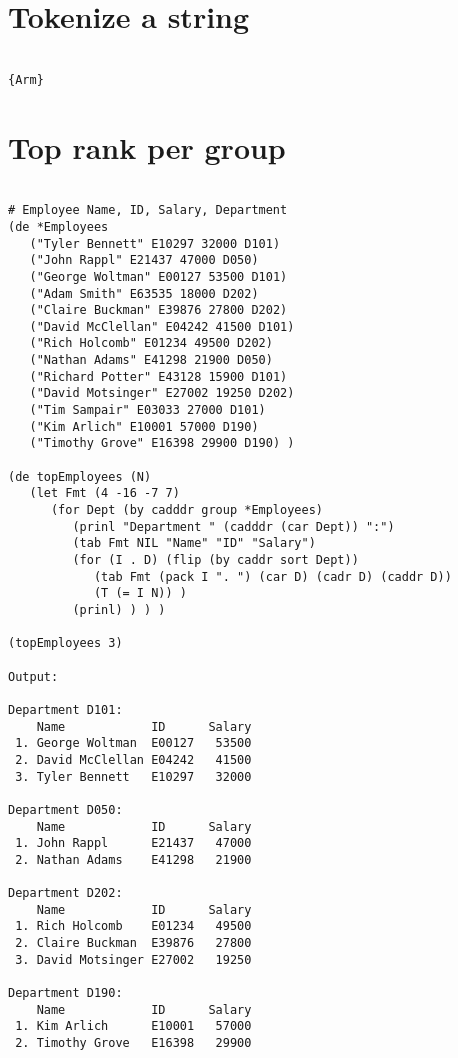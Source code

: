 \section*{Tokenize a string}

\begin{verbatim}

{Arm}

\end{verbatim}

\section*{Top rank per group}

\begin{verbatim}

# Employee Name, ID, Salary, Department
(de *Employees
   ("Tyler Bennett" E10297 32000 D101)
   ("John Rappl" E21437 47000 D050)
   ("George Woltman" E00127 53500 D101)
   ("Adam Smith" E63535 18000 D202)
   ("Claire Buckman" E39876 27800 D202)
   ("David McClellan" E04242 41500 D101)
   ("Rich Holcomb" E01234 49500 D202)
   ("Nathan Adams" E41298 21900 D050)
   ("Richard Potter" E43128 15900 D101)
   ("David Motsinger" E27002 19250 D202)
   ("Tim Sampair" E03033 27000 D101)
   ("Kim Arlich" E10001 57000 D190)
   ("Timothy Grove" E16398 29900 D190) )

(de topEmployees (N)
   (let Fmt (4 -16 -7 7)
      (for Dept (by cadddr group *Employees)
         (prinl "Department " (cadddr (car Dept)) ":")
         (tab Fmt NIL "Name" "ID" "Salary")
         (for (I . D) (flip (by caddr sort Dept))
            (tab Fmt (pack I ". ") (car D) (cadr D) (caddr D))
            (T (= I N)) )
         (prinl) ) ) )

(topEmployees 3)

Output:

Department D101:
    Name            ID      Salary
 1. George Woltman  E00127   53500
 2. David McClellan E04242   41500
 3. Tyler Bennett   E10297   32000

Department D050:
    Name            ID      Salary
 1. John Rappl      E21437   47000
 2. Nathan Adams    E41298   21900

Department D202:
    Name            ID      Salary
 1. Rich Holcomb    E01234   49500
 2. Claire Buckman  E39876   27800
 3. David Motsinger E27002   19250

Department D190:
    Name            ID      Salary
 1. Kim Arlich      E10001   57000
 2. Timothy Grove   E16398   29900

\end{verbatim}

